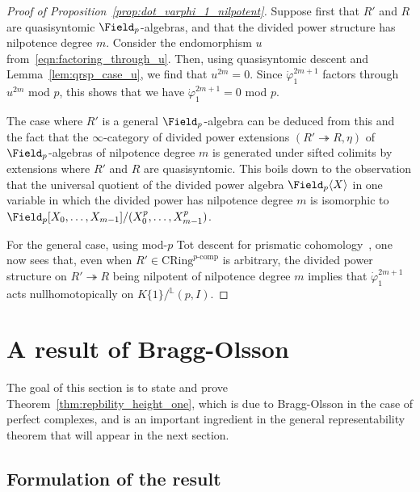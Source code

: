 \documentclass[10pt]{amsart}
\begin{document}
\begin{proof}
[Proof of Proposition~\ref{prop:dot_varphi_1_nilpotent}]
Suppose first that $R'$ and $R$ are quasisyntomic $\Field_p$-algebras, and that the divided power structure has nilpotence degree $m$. Consider the endomorphism $u$ from~\eqref{eqn:factoring_through_u}. Then, using quasisyntomic descent and Lemma~\ref{lem:qrsp_case_u}, we find that $u^{2m} = 0$. Since $\dot{\varphi}_1^{2m+1}$ factors through $u^{2m}$ mod $p$, this shows that we have $\dot{\varphi}_1^{2m+1} = 0$ mod $p$.

The case where $R'$ is a general $\Field_p$-algebra can be deduced from this and the fact that the $\infty$-category of divided power extensions $(R'\twoheadrightarrow R,\eta)$ of $\Field_p$-algebras of nilpotence degree $m$ is generated under sifted colimits by extensions where $R'$ and $R$ are quasisyntomic. This boils down to the observation that the universal quotient of the divided power algebra $\Field_p\langle X\rangle$ in one variable in which the divided power has nilpotence degree $m$ is isomorphic to $\Field_p[X_0,\ldots,X_{m-1}]/(X_0^p,\ldots,X_{m-1}^p)$.


For the general case, using mod-$p$ Tot descent for prismatic cohomology~\cite[Proposition 5.5.24]{bhatt2022absolute}, one now sees that, even when $R'\in \mathrm{CRing}^{p\text{-comp}}$ is arbitrary, the divided power structure on $R'\twoheadrightarrow R$ being nilpotent of nilpotence degree $m$ implies that $\dot{\varphi}_1^{2m+1}$ acts nullhomotopically on $K\{1\}/{}^{\mathbb{L}}(p,I)$.
\end{proof}






\section{A result of Bragg-Olsson}
\label{sec:technical_repbility}

The goal of this section is to state and prove Theorem~\ref{thm:repbility_height_one}, which is due to Bragg-Olsson in the case of perfect complexes, and is an important ingredient in the general representability theorem that will appear in the next section. 



\subsection{Formulation of the result}
\label{subsec:height_1}
\end{document}
